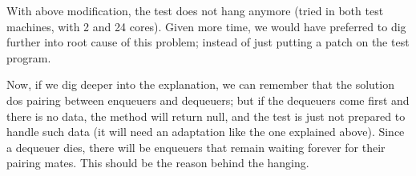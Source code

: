 With above modification, the test does not hang anymore (tried in both
test machines, with 2 and 24 cores). Given more time, we would have
preferred to dig further into root cause of this problem; instead of
just putting a patch on the test program.

Now, if we dig deeper into the explanation, we can remember that the solution 
dos pairing between enqueuers and dequeuers; but if the dequeuers come first and
there is no data, the  method will return null, and the test is just
not prepared to handle such data (it will need an adaptation like the one explained
above). Since a dequeuer dies, there will be enqueuers that remain waiting forever
for their pairing mates. This should be the reason behind the hanging.

